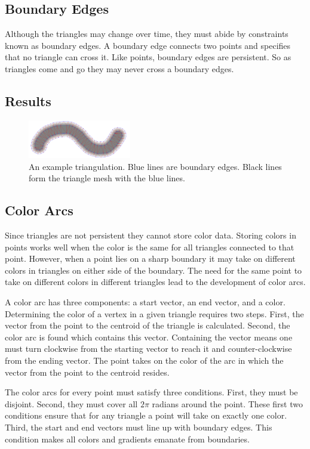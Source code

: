 \documentclass[conference]{acmsiggraph}
\begin{document}
\subsection{Boundary Edges}
Although the triangles may change over time, they must abide by constraints known as
boundary edges. A boundary edge connects two points and specifies that no triangle
can cross it. Like points, boundary edges are persistent. So as triangles come and go they
may never cross a boundary edges.

\subsection{Results}


\begin{figure}
    \centering
        \includegraphics[width=0.4\textwidth]{images/stroke}
    \caption{An example triangulation. Blue lines are boundary edges. Black lines form the triangle
    mesh with the blue lines.}
\end{figure}

\subsection{Color Arcs}
Since triangles are not persistent they cannot store color data.
Storing colors in points works well when the color is the same for all triangles connected
to that point. However, when a point lies on a sharp boundary it may take on different colors in
triangles on either side of the boundary. The need for the same point to take on different
colors in different triangles lead to the development of color arcs.

A color arc has three components: a start vector, an end vector, and a color. 
Determining the color of a vertex in a given triangle requires two steps. First,
the vector from the point to the centroid of the triangle is calculated. Second,
the color arc is found which contains this vector. Containing the vector means one must turn
clockwise from the starting vector to reach it and counter-clockwise from the ending vector.
The point takes on the color of the arc in which the vector from the point to the centroid resides.

The color arcs for every point must satisfy three conditions. First, they must be disjoint. Second,
they must cover all $2\pi$ radians around the point. These first two conditions ensure that for any
triangle a point will take on exactly one color. Third, the start and end vectors must line up
with boundary edges. This condition makes all colors and gradients emanate from boundaries.
\end{document}
